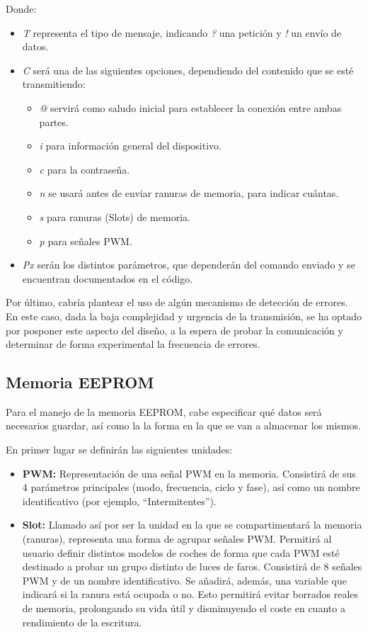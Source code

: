 Donde:

\begin{itemize}
    \item\textit{T} representa el tipo de mensaje, indicando \textit{?} una petición y \textit{!} un envío de datos.
    \item\textit{C} será una de las siguientes opciones, dependiendo del contenido que se esté transmitiendo:
        \begin{itemize}
            \item\textit{@} servirá como saludo inicial para establecer la conexión entre ambas partes.
            \item\textit{i} para información general del dispositivo.
            \item\textit{c} para la contraseña.
            \item\textit{n} se usará antes de enviar ranuras de memoria, para indicar cuántas.
            \item\textit{s} para ranuras (Slots) de memoria.
            \item\textit{p} para señales PWM.
        \end{itemize}
    \item\textit{Px} serán los distintos parámetros, que dependerán del comando enviado y se encuentran documentados en el código.
\end{itemize}

Por último, cabría plantear el uso de algún mecanismo de detección de errores. En este caso, dada la baja complejidad y urgencia de la transmisión, se ha optado por posponer este aspecto del diseño, a la espera de probar la comunicación y determinar de forma experimental la frecuencia de errores.

\subsection{Memoria EEPROM}

Para el manejo de la memoria EEPROM, cabe especificar qué datos será necesarios guardar, así como la la forma en la que se van a almacenar los mismos.

En primer lugar se definirán las siguientes unidades:

\begin{itemize}
    \item\textbf{PWM:} Representación de una señal PWM en la memoria. Consistirá de sus 4 parámetros principales (modo, frecuencia, ciclo y fase), así como un nombre identificativo (por ejemplo, ``Intermitentes'').
    \item\textbf{Slot:} Llamado así por ser la unidad en la que se compartimentará la memoria (ranuras), representa una forma de agrupar señales PWM. Permitirá al usuario definir distintos modelos de coches de forma que cada PWM esté destinado a probar un grupo distinto de luces de faros. Consistirá de 8 señales PWM y de un nombre identificativo. Se añadirá, además, una variable que indicará si la ranura está ocupada o no. Esto permitirá evitar borrados reales de memoria, prolongando su vida útil y disminuyendo el coste en cuanto a rendimiento de la escritura.
\end{itemize}

